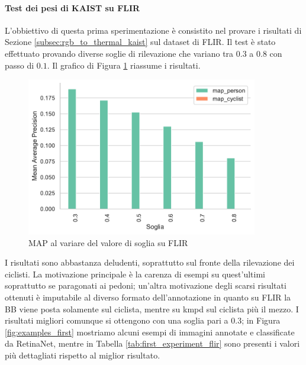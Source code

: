 \paragraph{Test dei pesi di KAIST su FLIR}
L'obbiettivo di questa prima sperimentazione è consistito nel provare i risultati di Sezione \ref{subsec:rgb_to_thermal_kaist} sul dataset di FLIR. Il test è stato effettuato provando diverse soglie di rilevazione che variano tra $0.3$ a $0.8$ con passo di $0.1$. Il grafico di Figura \ref{fig:map_first_flir_lwir} riassume i risultati. 
\begin{figure}[]
    \centering
    \includegraphics[width = 0.9\textwidth]{images/graphic/first_test_lwir_map.pdf}
    \caption{MAP al variare del valore di soglia su FLIR}
    \label{fig:map_first_flir_lwir}
\end{figure}
I risultati sono abbastanza deludenti, soprattutto sul fronte della rilevazione dei ciclisti. La motivazione principale è la carenza di esempi su quest'ultimi soprattutto se paragonati ai pedoni; un'altra motivazione degli scarsi risultati ottenuti è imputabile al diverso formato dell'annotazione in quanto su FLIR la \ac{BB} viene posta solamente sul ciclista, mentre su \ac{kmpd} sul ciclista più il mezzo. I risultati migliori comunque si ottengono con una soglia pari a $0.3$; in Figura \ref{fig:examples_first} mostriamo alcuni esempi di immagini annotate e classificate da RetinaNet, mentre in Tabella \ref{tab:first_experiment_flir} sono presenti i valori più dettagliati rispetto al miglior risultato. 
